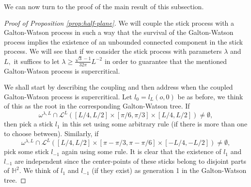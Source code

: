 \documentclass[a4paper,12pt]{article}
\newcommand{\BH}{{\mathbb{H}}}
\newcommand{\CL}{{\mathcal{L}}}
\begin{document}
We can now turn to the proof of the main result of this subsection.
\begin{proof}[Proof of Proposition \ref{prop:half-plane}]
We will couple the stick process with a Galton-Watson process in such a way that 
the survival of the Galton-Watson process implies the existence of an unbounded connected component
in the stick process.
We will see that if we consider the stick process with parameters 
$\lambda$ and $L,$
it suffices to let $\lambda \geq \frac{\sqrt{3}-1}{32 \pi}L^{-2}$ 
in order to guarantee that the mentioned
Galton-Watson process is supercritical.

We shall start by describing the coupling and then address when the coupled Galton-Watson 
process is supercritical.
Let $l_0=l_L(o,0)$ be as before, we think of this as the root in the corresponding 
Galton-Watson tree. 
If 
\[
\omega^{\lambda,L}\cap \CL^L([L/4,L/2]\times [\pi/6,\pi/3]\times [L/4,L/2]) \neq \emptyset,
\]
then pick a stick $l_1$ in this set using some arbitrary rule (if there is more than 
one to choose between). 
Similarly, if 
\[
\omega^{\lambda,L}\cap \CL^L([L/4,L/2]\times [\pi-\pi/3,\pi-\pi/6]\times [-L/4,-L/2]) \neq \emptyset,
\]
pick some stick $l_{-1}$ again using some rule. It is clear that the existence of 
$l_1$ and $l_{-1}$ are independent since the center-points of these sticks belong to disjoint 
parts of $\BH^2.$ We think of $l_1$ and $l_{-1}$ (if they exist) as generation 1 in the 
Galton-Watson tree. 


\end{proof}
\end{document}
